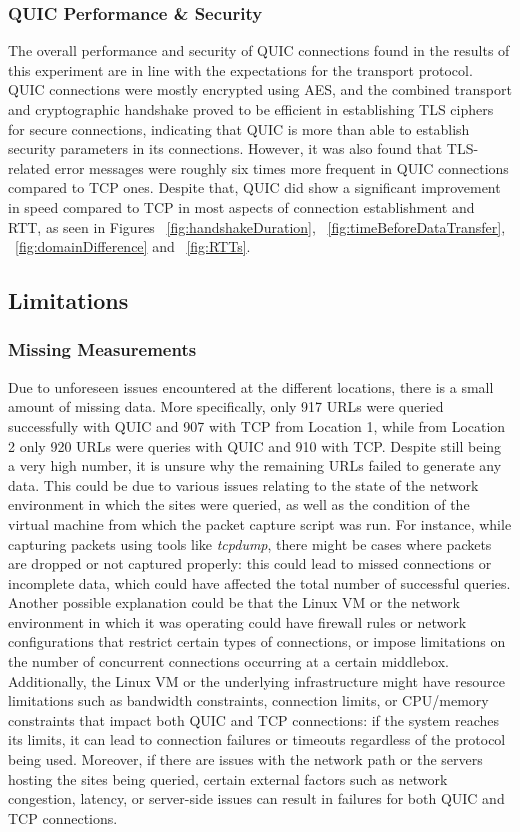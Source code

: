 \documentclass{l4proj}
\begin{document}
\subsubsection{QUIC Performance \& Security} The overall performance and security of QUIC connections found in the results of this experiment are in line with the expectations for the transport protocol. QUIC connections were mostly encrypted using AES, and the combined transport and cryptographic handshake proved to be efficient in establishing TLS ciphers for secure connections, indicating that QUIC is more than able to establish security parameters in its connections. However, it was also found that TLS-related error messages were roughly six times more frequent in QUIC connections compared to TCP ones. Despite that, QUIC did show a significant improvement in speed compared to TCP in most aspects of connection establishment and RTT, as seen in Figures ~\ref{fig:handshakeDuration}, ~\ref{fig:timeBeforeDataTransfer}, ~\ref{fig:domainDifference} and ~\ref{fig:RTTs}.

\subsection{Limitations}

\subsubsection{Missing Measurements} Due to unforeseen issues encountered at the different locations, there is a small amount of missing data. More specifically, only 917 URLs were queried successfully with QUIC and 907 with TCP from Location 1, while from Location 2 only 920 URLs were queries with QUIC and 910 with TCP. Despite still being a very high number, it is unsure why the remaining URLs failed to generate any data. This could be due to various issues relating to the state of the network environment in which the sites were queried, as well as the condition of the virtual machine from which the packet capture script was run. For instance, while capturing packets using tools like \emph{tcpdump}, there might be cases where packets are dropped or not captured properly: this could lead to missed connections or incomplete data, which could have affected the total number of successful queries. 
Another possible explanation could be that the Linux VM or the network environment in which it was operating could have firewall rules or network configurations that restrict certain types of connections, or impose limitations on the number of concurrent connections occurring at a certain middlebox. 
Additionally, the Linux VM or the underlying infrastructure might have resource limitations such as bandwidth constraints, connection limits, or CPU/memory constraints that impact both QUIC and TCP connections: if the system reaches its limits, it can lead to connection failures or timeouts regardless of the protocol being used. 
Moreover, if there are issues with the network path or the servers hosting the sites being queried, certain external factors such as network congestion, latency, or server-side issues can result in failures for both QUIC and TCP connections.
\end{document}
